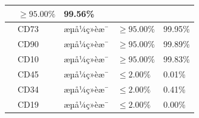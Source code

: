 \documentclass[UTF8,10pt,a4paper,fontset=fandol]{ctexart}
\newcommand{\fieldvalue}[1]{#1}
\begin{document}
\begin{tabularx}{\textwidth}{|>{\centering\arraybackslash}p{1.7cm}|>{\centering\arraybackslash}p{1.8cm}|>{\centering\arraybackslash}p{2.7cm}|X|X|}
&
\fieldvalue{$\geq 95.00\%$}
&
\fieldvalue{99.56\%}
\\
\cline{2-5}
&
\fieldvalue{CD73}
&
\fieldvalue{æµå¼ç»èæ¯}
&
\fieldvalue{$\geq 95.00\%$}
&
\fieldvalue{99.95\%}
\\
\cline{2-5}
&
\fieldvalue{CD90}
&
\fieldvalue{æµå¼ç»èæ¯}
&
\fieldvalue{$\geq 95.00\%$}
&
\fieldvalue{99.89\%}
\\
\cline{2-5}
&
\fieldvalue{CD10}
&
\fieldvalue{æµå¼ç»èæ¯}
&
\fieldvalue{$\geq 95.00\%$}
&
\fieldvalue{99.83\%}
\\
\cline{2-5}
&
\fieldvalue{CD45}
&
\fieldvalue{æµå¼ç»èæ¯}
&
\fieldvalue{$\leq 2.00\%$}
&
\fieldvalue{0.01\%}
\\
\cline{2-5}
&
\fieldvalue{CD34}
&
\fieldvalue{æµå¼ç»èæ¯}
&
\fieldvalue{$\leq 2.00\%$}
&
\fieldvalue{0.41\%}
\\
\cline{2-5}
&
\fieldvalue{CD19}
&
\fieldvalue{æµå¼ç»èæ¯}
&
\fieldvalue{$\leq 2.00\%$}
&
\fieldvalue{0.00\%}
\\
\hline
\end{tabularx}
\end{document}
